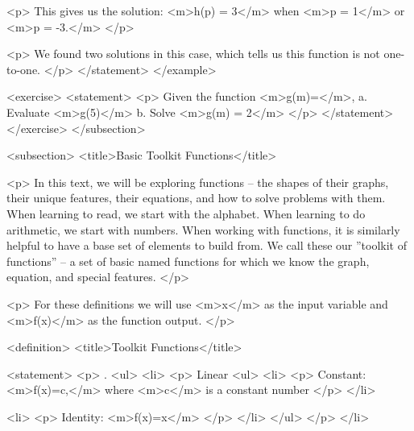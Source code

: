                 <p>
                    This gives us the solution: <m>h(p) = 3</m> when <m>p = 1</m> or <m>p = -3.</m>
                </p>

                <p>
                    We found two solutions in this case, which tells us this function is not one-to-one.
                </p>
            </statement>
        </example>

        <exercise>
            <statement>
                <p>
                    Given the function <m>g(m)=</m>, a.
                    Evaluate <m>g(5)</m> b.
                    Solve <m>g(m) = 2</m>
                </p>
            </statement>
        </exercise>
    </subsection>


    <subsection>
        <title>Basic Toolkit Functions</title>

        <p>
            In this text, we will be exploring functions – the shapes of their graphs, their unique features, their equations, and how to solve problems with them.
            When learning to read, we start with the alphabet.
            When learning to do arithmetic, we start with numbers.
            When working with functions, it is similarly helpful to have a base set of elements to build from.
            We call these our ”toolkit of functions” – a set of basic named functions for which we know the graph, equation, and special features.
        </p>

        <p>
            For these definitions we will use <m>x</m> as the input variable and <m>f(x)</m> as the function output.
        </p>

        <definition>
            <title>Toolkit Functions</title>

            <statement>
                <p>
                    .
                    <ul>
                        <li>
                            <p>
                                Linear
                                <ul>
                                    <li>
                                        <p>
                                            Constant: <m>f(x)=c,</m> where <m>c</m> is a constant number
                                        </p>
                                    </li>

                                    <li>
                                        <p>
                                            Identity: <m>f(x)=x</m>
                                        </p>
                                    </li>
                                </ul>
                            </p>
                        </li>

